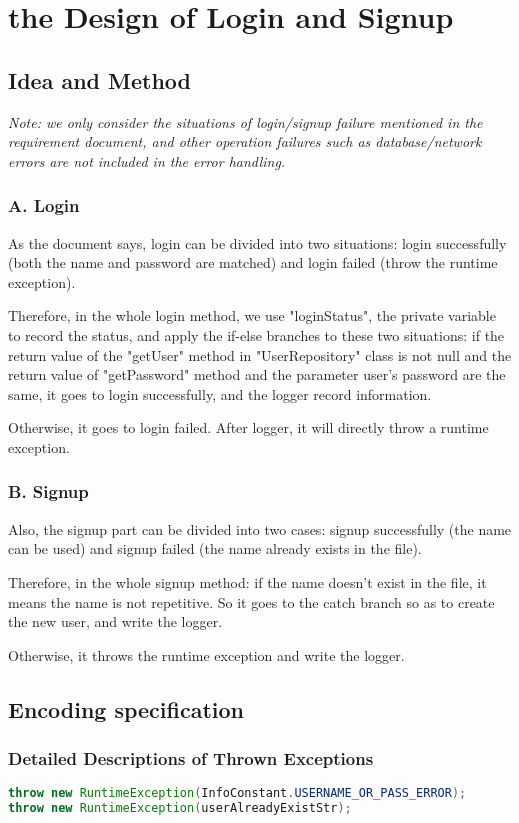 \documentclass[./report.tex]{subfiles}
\begin{document}
\section{the Design of Login and Signup}
 \subsection{Idea and Method}
 \emph {Note: we only consider the situations of login/signup failure mentioned in the requirement document, and other operation failures such as database/network errors are not included in the error handling.}
 \subsubsection{A. Login}
\par As the document says, login can be divided into two situations: login successfully (both the name and password are matched) and login failed (throw the runtime exception).
\par Therefore, in the whole login method, we use "loginStatus", the private variable to record the status, and apply the if-else branches to these two situations: if the return value of the "getUser" method
in "UserRepository" class is not null and the return value of "getPassword" method and the parameter user's password are the same, it goes to login successfully, and the logger record information.
\par Otherwise, it goes to login failed. After logger, it will directly throw a runtime exception.
 \subsubsection{B. Signup}
\par Also, the signup part can be divided into two cases: signup successfully (the name can be used) and signup failed (the name already exists in the file).
\par Therefore, in the whole signup method: if the name doesn't exist in the file, it means the name is not repetitive. So it goes to the catch branch so as to create the new user, and write the logger.
\par Otherwise, it throws the runtime exception and write the logger.
 \subsection{Encoding specification}
  \subsubsection{Detailed Descriptions of Thrown Exceptions }
\begin{lstlisting}[language=java]
throw new RuntimeException(InfoConstant.USERNAME_OR_PASS_ERROR);
throw new RuntimeException(userAlreadyExistStr);
\end{lstlisting}
\end{document}
